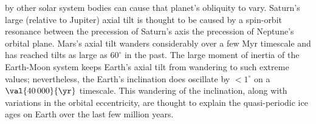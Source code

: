  by other solar system bodies can cause that planet's obliquity to vary.  Saturn's large (relative to Jupiter) axial tilt is thought to be caused by a spin-orbit resonance between the precession of Saturn's axis the precession of Neptune's orbital plane\cite{Ward2004Tilting-Saturn.}.  Mars's axial tilt wanders considerably over a few Myr timescale and has reached tilts as large as $60^{\circ}$ in the past.  The large moment of inertia of the Earth-Moon system keeps Earth's axial tilt from wandering to such extreme values; nevertheless, the Earth's inclination does oscillate by $<1^{\circ}$ on a $\val{40\,000}{\yr}$ timescale.  This wandering of the inclination, along with variations in the orbital eccentricity, are thought to explain the quasi-periodic ice ages on Earth over the last few million years\cite{Zachos2001Trends-Rhythms-}.

